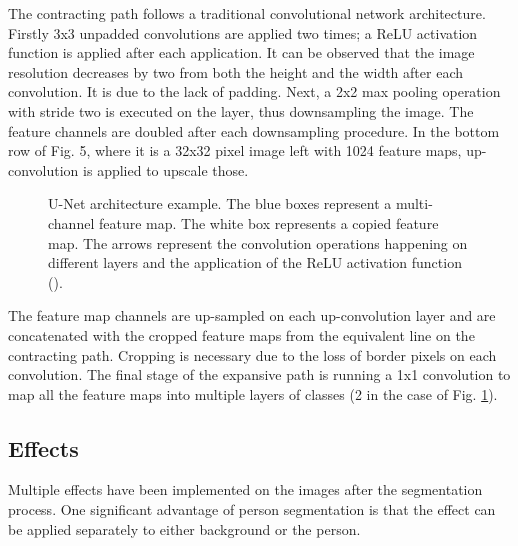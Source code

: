 \documentclass[english]{sbrt}
\begin{document}
The contracting path follows a traditional convolutional network architecture. Firstly 3x3 unpadded convolutions are applied two times; a ReLU activation function is applied after each application. It can be observed that the image resolution decreases by two from both the height and the width after each convolution. It is due to the lack of padding. Next, a 2x2 max pooling operation with stride two is executed on the layer, thus downsampling the image. The feature channels are doubled after each downsampling procedure. 
In the bottom row of Fig. 5, where it is a 32x32 pixel image left with 1024 feature maps, up-convolution is applied to upscale those.

\begin{figure}[hbt]
\centering 
{}
\caption{\label{fig:fig5} U-Net architecture example. The blue boxes represent a multi-channel feature map. The white box represents a copied feature map. The arrows represent the convolution operations happening on different layers and the application of the ReLU activation function (\cite{ronneberger_2015_unet}).}
\end{figure}

The feature map channels are up-sampled on each up-convolution layer and are concatenated with the cropped feature maps from the equivalent line on the contracting path. Cropping is necessary due to the loss of border pixels on each convolution. The final stage of the expansive path is running a 1x1 convolution to map all the feature maps into multiple layers of classes (2 in the case of Fig. \ref{fig:fig5}).

\subsection{Effects}
Multiple effects have been implemented on the images after the segmentation process. One significant advantage of person segmentation is that the effect can be applied separately to either background or the person. 
\end{document}
